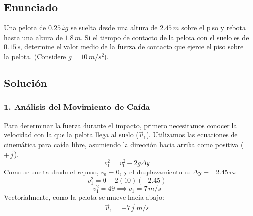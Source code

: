 \documentclass[12pt, a4paper]{article}
\begin{document}
\subsection*{Enunciado}
Una pelota de $0.25 \, \si{kg}$ se suelta desde una altura de $2.45 \, \si{m}$ sobre el piso y rebota hasta una altura de $1.8 \, \si{m}$. Si el tiempo de contacto de la pelota con el suelo es de $0.15 \, \si{s}$, determine el valor medio de la fuerza de contacto que ejerce el piso sobre la pelota. (Considere $g = 10 \, \si{m/s^2}$).

\begin{center}
\end{center}

\subsection*{Solución}

\subsubsection*{1. Análisis del Movimiento de Caída}
Para determinar la fuerza durante el impacto, primero necesitamos conocer la velocidad con la que la pelota llega al suelo ($\vec{v}_1$). Utilizamos las ecuaciones de cinemática para caída libre, asumiendo la dirección hacia arriba como positiva ($+\vec{j}$).
\[ v_1^2 = v_0^2 - 2g \Delta y \]
Como se suelta desde el reposo, $v_0 = 0$, y el desplazamiento es $\Delta y = -2.45 \, \si{m}$:
\[ v_1^2 = 0 - 2(10)(-2.45) \]
\[ v_1^2 = 49 \implies v_1 = 7 \, \si{m/s} \]
Vectorialmente, como la pelota se mueve hacia abajo:
\[ \vec{v}_1 = -7 \vec{j} \, \si{m/s} \]
\end{document}
